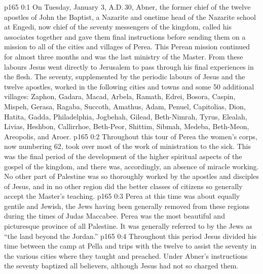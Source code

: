 \author{Midwayer Commission}
\vs p165 0:1 On Tuesday, January 3, A.D.\,30, Abner, the former chief of the twelve apostles of John the Baptist, a Nazarite and onetime head of the Nazarite school at Engedi, now chief of the seventy messengers of the kingdom, called his associates together and gave them final instructions before sending them on a mission to all of the cities and villages of Perea. This Perean mission continued for almost three months and was the last ministry of the Master. From these labours Jesus went directly to Jerusalem to pass through his final experiences in the flesh. The seventy, supplemented by the periodic labours of Jesus and the twelve apostles, worked in the following cities and towns and some 50 additional villages: Zaphon, Gadara, Macad, Arbela, Ramath, Edrei, Bosora, Caspin, Mispeh, Gerasa, Ragaba, Succoth, Amathus, Adam, Penuel, Capitolias, Dion, Hatita, Gadda, Philadelphia, Jogbehah, Gilead, Beth\hyp{}Nimrah, Tyrus, Elealah, Livias, Heshbon, Callirrhoe, Beth\hyp{}Peor, Shittim, Sibmah, Medeba, Beth\hyp{}Meon, Areopolis, and Aroer.
\vs p165 0:2 Throughout this tour of Perea the women’s corps, now numbering 62, took over most of the work of ministration to the sick. This was the final period of the development of the higher spiritual aspects of the gospel of the kingdom, and there was, accordingly, an absence of miracle working. No other part of Palestine was so thoroughly worked by the apostles and disciples of Jesus, and in no other region did the better classes of citizens so generally accept the Master’s teaching.
\vs p165 0:3 Perea at this time was about equally gentile and Jewish, the Jews having been generally removed from these regions during the times of Judas Maccabee. Perea was the most beautiful and picturesque province of all Palestine. It was generally referred to by the Jews as “the land beyond the Jordan.”
\vs p165 0:4 Throughout this period Jesus divided his time between the camp at Pella and trips with the twelve to assist the seventy in the various cities where they taught and preached. Under Abner’s instructions the seventy baptized all believers, although Jesus had not so charged them.
